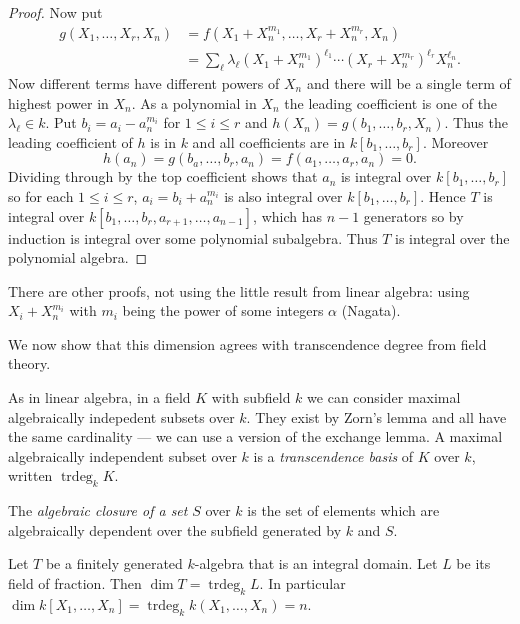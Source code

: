 \documentclass[a4paper]{article}
\DeclareMathOperator{\trdeg}{trdeg} %
\begin{document}
\begin{proof}
  Now put
  \begin{align*}
    g(X_1, \dots, X_r, X_n)
    &= f(X_1 + X_n^{m_1}, \dots, X_r + X_n^{m_r}, X_n) \\
    &= \sum_\ell \lambda_\ell (X_1 + X_n^{m_1})^{\ell_1} \cdots (X_r + X_n^{m_r})^{\ell_r} X_n^{\ell_n}.
  \end{align*}
  Now different terms have different powers of \(X_n\) and there will be a single term of highest power in \(X_n\). As a polynomial in \(X_n\) the leading coefficient is one of the \(\lambda_\ell \in k\). Put \(b_i = a_i - a_n^{m_i}\) for \(1 \leq i \leq r\) and \(h(X_n) = g(b_1, \dots, b_r, X_n)\). Thus the leading coefficient of \(h\) is in \(k\) and all coefficients are in \(k[b_1, \dots, b_r]\). Moreover
  \[
    h(a_n) = g(b_a, \dots, b_r, a_n) = f(a_1, \dots, a_r, a_n) = 0.
  \]
  Dividing through by the top coefficient shows that \(a_n\) is integral over \(k[b_1, \dots, b_r]\) so for each \(1 \leq i \leq r\), \(a_i = b_i + a_n^{m_i}\) is also integral over \(k[b_1, \dots, b_r]\). Hence \(T\) is integral over \(k[b_1, \dots, b_r, a_{r + 1}, \dots, a_{n - 1}]\), which has \(n - 1\) generators so by induction is integral over some polynomial subalgebra. Thus \(T\) is integral over the polynomial algebra.
\end{proof}

\begin{remark}
  There are other proofs, not using the little result from linear algebra: using \(X_i + X_n^{m_i}\) with \(m_i\) being the power of some integers \(\alpha\) (Nagata).
\end{remark}

We now show that this dimension agrees with transcendence degree from field theory.

As in linear algebra, in a field \(K\) with subfield \(k\) we can consider maximal algebraically indepedent subsets over \(k\). They exist by Zorn's lemma and all have the same cardinality --- we can use a version of the exchange lemma. A maximal algebraically independent subset over \(k\) is a \emph{transcendence basis} of \(K\) over \(k\), written \(\trdeg_k K\).

The \emph{algebraic closure of a set} \(S\) over \(k\) is the set of elements which are algebraically dependent over the subfield generated by \(k\) and \(S\).

\begin{theorem}
  Let \(T\) be a finitely generated \(k\)-algebra that is an integral domain. Let \(L\) be its field of fraction. Then \(\dim T = \trdeg_k L\). In particular \(\dim k[X_1, \dots, X_n] = \trdeg_k k(X_1, \dots, X_n) = n\).
\end{theorem}
\end{document}
